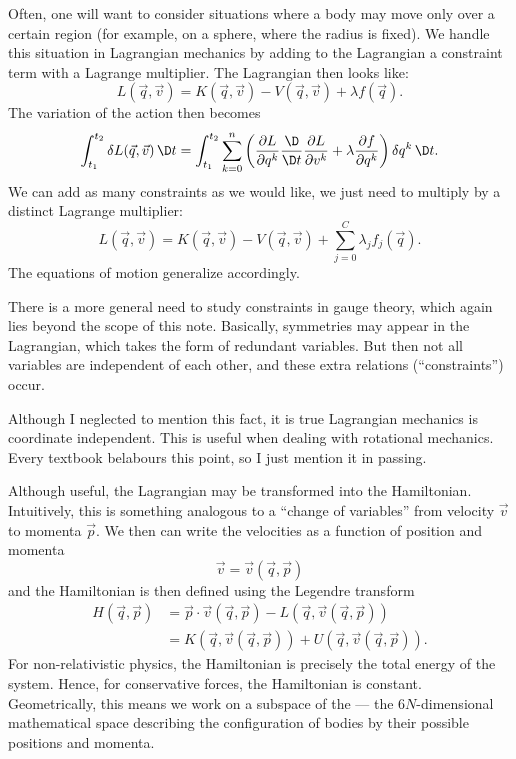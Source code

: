 Often, one will want to consider situations where a body may move only
over a certain region (for example, on a sphere, where the radius is
fixed). We handle this situation in Lagrangian mechanics by adding to
the Lagrangian a constraint term with a Lagrange multiplier. The
Lagrangian then looks like:
\begin{equation}
L(\vec{q},\vec{v}) = K(\vec{q},\vec{v}) - V(\vec{q},\vec{v}) + \lambda f(\vec{q}).
\end{equation}
The variation of the action then becomes
\begin{equation}
\int^{t_{2}}_{t_{1}}\delta L(\vec{q},\vec{v})\,\D t
= \int^{t_{2}}_{t_{1}}\sum^{n}_{k=0}\left(
\frac{\partial L}{\partial q^{k}}
\frac{\D}{\D t}\frac{\partial L}{\partial v^{k}}
+ \lambda\frac{\partial f}{\partial q^{k}}
\right)\delta q^{k}\,\D t.
\end{equation}
We can add as many constraints as we would like, we just need to
multiply by a distinct Lagrange multiplier:
\begin{equation}
L(\vec{q},\vec{v}) = K(\vec{q},\vec{v}) - V(\vec{q},\vec{v}) + \sum^{C}_{j=0}\lambda_{j} f_{j}(\vec{q}).
\end{equation}
The equations of motion generalize accordingly.

There is a more general need to study constraints in gauge theory, which
again lies beyond the scope of this note. Basically, symmetries may
appear in the Lagrangian, which takes the form of redundant
variables. But then not all variables are independent of each other, and
these extra relations (``constraints'') occur.

Although I neglected to mention this fact, it is true Lagrangian
mechanics is coordinate independent. This is useful when dealing with
rotational mechanics. Every textbook belabours this point, so I just
mention it in passing.

Although useful, the Lagrangian may be transformed into the
Hamiltonian. Intuitively, this is something analogous to a ``change of
variables'' from velocity $\vec{v}$ to momenta $\vec{p}$. We then can
write the velocities as a function of position and momenta
\begin{equation}
\vec{v} = \vec{v}(\vec{q},\vec{p})
\end{equation}
and the Hamiltonian is then defined using the Legendre transform
\begin{equation}
  \begin{split}
  H(\vec{q},\vec{p}) &= \vec{p}\cdot\vec{v}(\vec{q},\vec{p})
  - L(\vec{q}, \vec{v}(\vec{q},\vec{p}))\\
  &= K(\vec{q}, \vec{v}(\vec{q},\vec{p})) + U(\vec{q}, \vec{v}(\vec{q},\vec{p})).
  \end{split}
\end{equation}
For non-relativistic physics, the Hamiltonian is precisely the total
energy of the system. Hence, for conservative forces, the Hamiltonian is
constant. Geometrically, this means we work on a subspace of the
 --- the $6N$-dimensional mathematical space
describing the configuration of bodies by their possible positions and
momenta.

